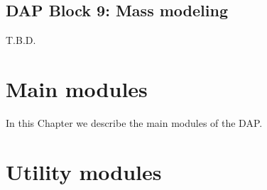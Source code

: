 \documentclass[11pt]{book}
\begin{document}
\section{DAP Block 9: Mass modeling}
\label{dap_sec:block9}
T.B.D.


\chapter{Main modules}
\label{dap_chap:dap_modules}

In this Chapter we describe the main modules of the DAP.



















\chapter{Utility modules}











%
%
	
\end{document}
